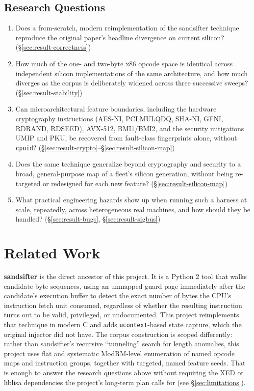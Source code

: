 \documentclass[11pt]{article}
\newcommand{\code}[1]{\texttt{#1}}
\begin{document}
\subsection{Research Questions}
\begin{enumerate}[label=\textbf{RQ\arabic*}.]
  \item Does a from-scratch, modern reimplementation of the sandsifter
    technique reproduce the original paper's headline divergence on
    current silicon? (\S\ref{sec:result-correctness})
  \item How much of the one- and two-byte x86 opcode space is identical
    across independent silicon implementations of the same architecture,
    and how much diverges as the corpus is deliberately widened across
    three successive sweeps? (\S\ref{sec:result-stability})
  \item Can microarchitectural feature boundaries, including the hardware
    cryptography instructions (AES-NI, PCLMULQDQ, SHA-NI, GFNI, RDRAND,
    RDSEED), AVX-512, BMI1/BMI2, and the security mitigations UMIP and
    PKU, be recovered from fault-class fingerprints alone, without
    \code{cpuid}? (\S\ref{sec:result-crypto}--\S\ref{sec:result-silicon-map})
  \item Does the same technique generalize beyond cryptography and
    security to a broad, general-purpose map of a fleet's silicon
    generation, without being re-targeted or redesigned for each new
    feature? (\S\ref{sec:result-silicon-map})
  \item What practical engineering hazards show up when running such a
    harness at scale, repeatedly, across heterogeneous real machines, and
    how should they be handled? (\S\ref{sec:result-bugs}, \S\ref{sec:result-sigbus})
\end{enumerate}

\section{Related Work}

\textbf{sandsifter} \cite{domas2017} is the direct ancestor of this
project. It is a Python 2 tool that walks candidate byte sequences, using
an unmapped guard page immediately after the candidate's execution buffer
to detect the exact number of bytes the CPU's instruction fetch unit
consumed, regardless of whether the resulting instruction turns out to be
valid, privileged, or undocumented. This project reimplements that
technique in modern C and adds \code{ucontext}-based state capture, which
the original injector did not have. The corpus construction is scoped
differently: rather than sandsifter's recursive ``tunneling'' search for
length anomalies, this project uses flat and systematic ModRM-level
enumeration of named opcode maps and instruction groups, together with
targeted, named feature seeds. That is enough to answer the research
questions above without requiring the XED or liblisa dependencies the
project's long-term plan calls for (see \S\ref{sec:limitations}).
\end{document}
